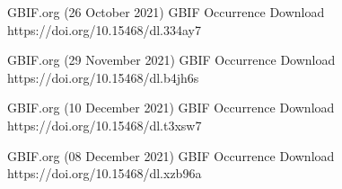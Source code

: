 \documentclass[12pt,a4paper]{article}
\begin{document}
\begin{thebibliography}{999}
GBIF.org (26 October 2021) GBIF Occurrence Download  https://doi.org/10.15468/dl.334ay7

GBIF.org (29 November 2021) GBIF Occurrence Download  https://doi.org/10.15468/dl.b4jh6s

GBIF.org (10 December 2021) GBIF Occurrence Download  https://doi.org/10.15468/dl.t3xsw7

GBIF.org (08 December 2021) GBIF Occurrence Download  https://doi.org/10.15468/dl.xzb96a

























\end{thebibliography}
\end{document}
